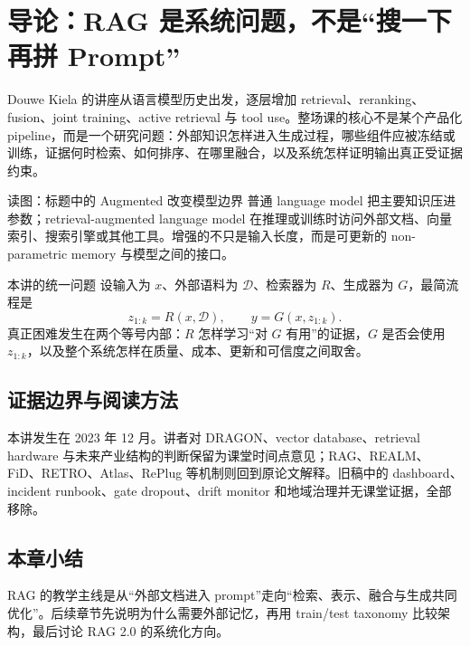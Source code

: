 \section{导论：RAG 是系统问题，不是“搜一下再拼 Prompt”}

Douwe Kiela 的讲座从语言模型历史出发，逐层增加 retrieval、reranking、fusion、joint training、active retrieval 与 tool use。整场课的核心不是某个产品化 pipeline，而是一个研究问题：外部知识怎样进入生成过程，哪些组件应被冻结或训练，证据何时检索、如何排序、在哪里融合，以及系统怎样证明输出真正受证据约束。


\begin{knowledgebox}{读图：标题中的 Augmented 改变模型边界}
普通 language model 把主要知识压进参数；retrieval-augmented language model 在推理或训练时访问外部文档、向量索引、搜索引擎或其他工具。增强的不只是输入长度，而是可更新的 non-parametric memory 与模型之间的接口。
\end{knowledgebox}

\begin{importantbox}{本讲的统一问题}
设输入为 $x$、外部语料为 $\mathcal{D}$、检索器为 $R$、生成器为 $G$，最简流程是
\[
z_{1:k}=R(x,\mathcal{D}),\qquad
y=G(x,z_{1:k}).
\]
真正困难发生在两个等号内部：$R$ 怎样学习“对 $G$ 有用”的证据，$G$ 是否会使用 $z_{1:k}$，以及整个系统怎样在质量、成本、更新和可信度之间取舍。
\end{importantbox}

\subsection{证据边界与阅读方法}

本讲发生在 2023 年 12 月。讲者对 DRAGON、vector database、retrieval hardware 与未来产业结构的判断保留为课堂时间点意见；RAG、REALM、FiD、RETRO、Atlas、RePlug 等机制则回到原论文解释。旧稿中的 dashboard、incident runbook、gate dropout、drift monitor 和地域治理并无课堂证据，全部移除。

\subsection{本章小结}

RAG 的教学主线是从“外部文档进入 prompt”走向“检索、表示、融合与生成共同优化”。后续章节先说明为什么需要外部记忆，再用 train/test taxonomy 比较架构，最后讨论 RAG 2.0 的系统化方向。

